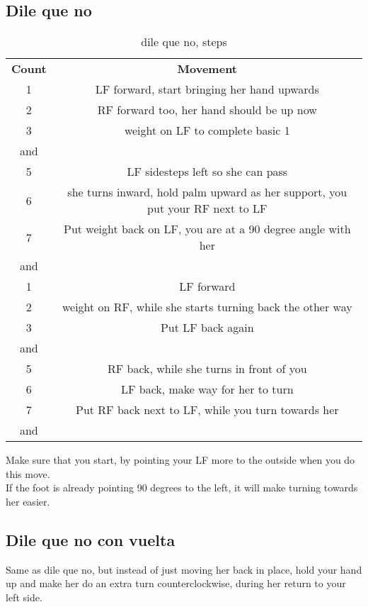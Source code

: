 \subsection{Dile que no}
\begin{table}[H]
\centering
\begin{tabular}{cc}
  \toprule
  \textbf{Count} & \textbf{Movement}\\
  \cmidrule(lr){1-1}\cmidrule(lr){2-2}
  1 & LF forward, start bringing her hand upwards\\
  2 & RF forward too, her hand should be up now\\
  3 & weight on LF to complete basic 1\\
  and & \\
  5 & LF sidesteps left so she can pass\\
  6 & she turns inward, hold palm upward as her support, you put your RF next to LF\\
  7 & Put weight back on LF, you are at a 90 degree angle with her\\
  and & \\
  1 & LF forward\\
  2 & weight on RF, while she starts turning back the other way\\
  3 & Put LF back again\\
  and & \\
  5 & RF back, while she turns in front of you\\
  6 & LF back, make way for her to turn\\
  7 & Put RF back next to LF, while you turn towards her\\
  and & \\
  \bottomrule
\end{tabular}
\label{dileequeno_steps}
\caption{dile que no, steps}
\end{table}

Make sure that you start, by pointing your LF more to the outside when you do this move.\\
If the foot is already pointing 90 degrees to the left, it will make turning towards her easier.

\subsection{Dile que no con vuelta}
Same as dile que no, but instead of just moving her back in place, hold your hand up and make her do an extra turn counterclockwise,
during her return to your left side.

